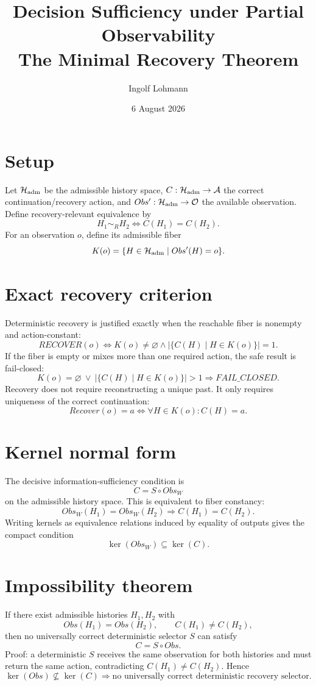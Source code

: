 \documentclass[11pt,a4paper]{article}
\title{Decision Sufficiency under Partial Observability\\\large The Minimal Recovery Theorem}
\author{Ingolf Lohmann}
\date{6 August 2026}
\begin{document}
\maketitle

\section*{Setup}
Let $\mathcal H_{\rm adm}$ be the admissible history space, $C:\mathcal H_{\rm adm}\to\mathcal A$ the correct continuation/recovery action, and $Obs':\mathcal H_{\rm adm}\to\mathcal O$ the available observation. Define recovery-relevant equivalence by
\[
H_1\sim_R H_2\iff C(H_1)=C(H_2).
\]
For an observation $o$, define its admissible fiber
\[
K(o)=\{H\in\mathcal H_{\rm adm}\mid Obs'(H)=o\}.
\]

\section*{Exact recovery criterion}
Deterministic recovery is justified exactly when the reachable fiber is nonempty and action-constant:
\[
\boxed{
RECOVER(o)\iff K(o)\neq\varnothing\land
\left|\{C(H)\mid H\in K(o)\}\right|=1
}.
\]
If the fiber is empty or mixes more than one required action, the safe result is fail-closed:
\[
\boxed{
K(o)=\varnothing\ \lor\
\left|\{C(H)\mid H\in K(o)\}\right|>1
\Rightarrow FAIL\_CLOSED.
}
\]
Recovery does not require reconstructing a unique past. It only requires uniqueness of the correct continuation:
\[
Recover(o)=a\iff\forall H\in K(o):C(H)=a.
\]

\section*{Kernel normal form}
The decisive information-sufficiency condition is
\[
\boxed{C=S\circ Obs_W}
\]
on the admissible history space. This is equivalent to fiber constancy:
\[
\boxed{Obs_W(H_1)=Obs_W(H_2)\Rightarrow C(H_1)=C(H_2)}.
\]
Writing kernels as equivalence relations induced by equality of outputs gives the compact condition
\[
\boxed{\ker(Obs_W)\subseteq\ker(C)}.
\]

\section*{Impossibility theorem}
If there exist admissible histories $H_1,H_2$ with
\[
Obs(H_1)=Obs(H_2),\qquad C(H_1)\neq C(H_2),
\]
then no universally correct deterministic selector $S$ can satisfy
\[
C=S\circ Obs.
\]
Proof: a deterministic $S$ receives the same observation for both histories and must return the same action, contradicting $C(H_1)\neq C(H_2)$. Hence
\[
\boxed{\ker(Obs)\not\subseteq\ker(C)\Rightarrow
\text{no universally correct deterministic recovery selector}.}
\]
\end{document}
